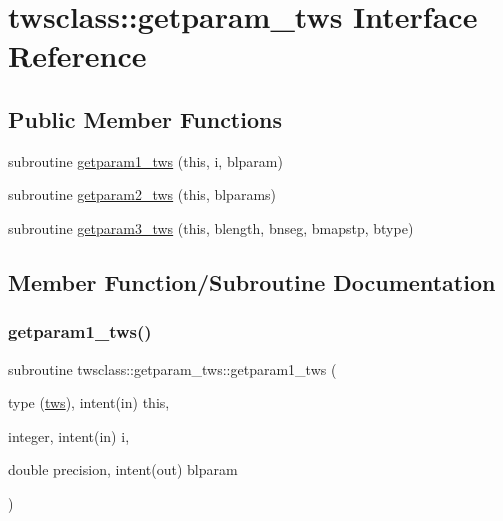 \hypertarget{interfacetwsclass_1_1getparam__tws}{}\section{twsclass\+::getparam\+\_\+tws Interface Reference}
\label{interfacetwsclass_1_1getparam__tws}
\subsection*{Public Member Functions}
\begin{DoxyCompactItemize}
\item 
subroutine \mbox{\hyperlink{interfacetwsclass_1_1getparam__tws_aaebe4bb735f3c4cb0d424b804dbbbe84}{getparam1\+\_\+tws}} (this, i, blparam)
\item 
subroutine \mbox{\hyperlink{interfacetwsclass_1_1getparam__tws_aa0b0b71e4c7beff3829756f81e66cfc8}{getparam2\+\_\+tws}} (this, blparams)
\item 
subroutine \mbox{\hyperlink{interfacetwsclass_1_1getparam__tws_a0340deca6dd4f703531d54db0c0fb8e5}{getparam3\+\_\+tws}} (this, blength, bnseg, bmapstp, btype)
\end{DoxyCompactItemize}


\subsection{Member Function/\+Subroutine Documentation}
\mbox{\label{interfacetwsclass_1_1getparam__tws_aaebe4bb735f3c4cb0d424b804dbbbe84}} 
\subsubsection{\texorpdfstring{getparam1\_tws()}{getparam1\_tws()}}
{\footnotesize\ttfamily subroutine twsclass\+::getparam\+\_\+tws\+::getparam1\+\_\+tws (\begin{DoxyParamCaption}\item[{type (\mbox{\hyperlink{namespacetwsclass_structtwsclass_1_1tws}{tws}}), intent(in)}]{this,  }\item[{integer, intent(in)}]{i,  }\item[{double precision, intent(out)}]{blparam }\end{DoxyParamCaption})}

